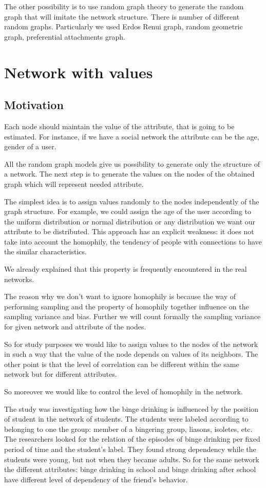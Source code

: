 \documentclass[12pt]{report}
\begin{document}
The other possibility is to use random graph theory to generate the random graph that will imitate the network structure. There is number of different random graphs. Particularly we used Erdos Renui graph, random geometric graph, preferential attachments graph.

\section{Network with values}

\subsection{Motivation}

Each node should maintain the value of the attribute, that is going to be estimated. For instance, if we have a social network the attribute can be the age, gender of a user.  

All the random graph models give us possibility to generate only the structure of a network. The next step is to generate the values on the nodes of the obtained graph which will represent needed attribute. 

The simplest idea is to assign values randomly to the nodes independently of the graph structure. For example, we could assign the age of the user according to the uniform distribution or normal distribution or any distribution we want our attribute to be distributed. This approach has an explicit weakness: it does not take into account the homophily, the tendency of people with connections to have the similar characteristics.

We already explained that this property is frequently encountered in the real networks.

The reason why we don't want to ignore homophily is because the way of performing sampling and the property of homophily together influence on the sampling variance and bias. Further we will count formally the sampling variance for given network and attribute of the nodes.

So for study purposes we would like to assign values to the nodes of the network in such a way that the value of the node depends on values of its neighbors.
The other point is that the level of correlation can be different within the same network but for different attributes. 

So moreover we would like to control the level of homophily in the network. 

The study \cite{pollard2013adolescent} was investigating how the binge drinking is influenced by the position of student in the network of students. The students were labeled according to belonging to one the group: member of a bingering group, liasons, isoletes, etc. The researchers looked for the relation of the episodes of binge drinking per fixed period of time and the student's label. They found strong dependency while the students were young, but not when they became adults. So for the same network the different attributes: binge drinking in school and binge drinking after school have different level of dependency of the friend's behavior.
\end{document}
